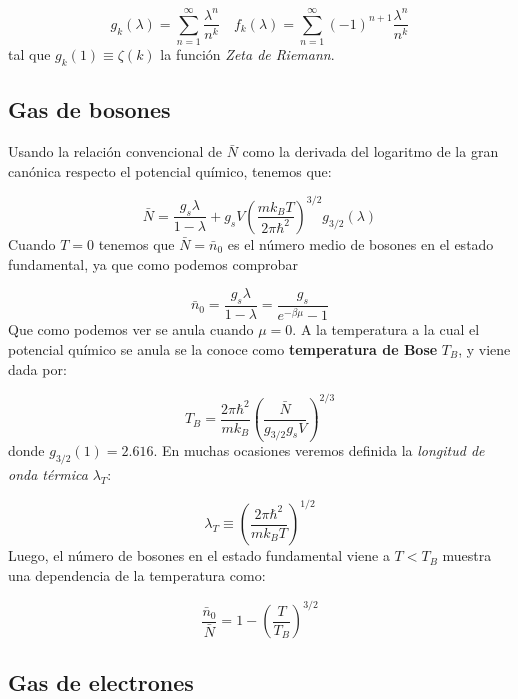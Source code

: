 \documentclass[12pt,a4paper]{article}
\numberwithin{equation}{section}
\numberwithin{figure}{section}
\newcommand{\parentesis}[1]{\left( #1  \right)}
\theoremstyle{definition}
\begin{document}
\begin{equation}
g_k (\lambda) = \sum_{n=1}^\infty \frac{\lambda^n}{n^k} \quad f_k (\lambda) = \sum_{n=1}^\infty (-1)^{n+1} \frac{\lambda^n}{n^k} 
\end{equation}
tal que $g_k(1)\equiv \zeta (k)$ la función \textit{Zeta de Riemann}. 

\subsection{Gas de bosones}

Usando la relación convencional de $\bar{N}$ como la derivada del logaritmo de la gran canónica respecto el potencial químico, tenemos que:

\begin{equation}
\bar{N} = \frac{g_s \lambda}{1-\lambda} + g_s V \parentesis{\frac{m k_B T}{2 \pi \hbar^2}}^{3/2} g_{3/2} (\lambda)
\end{equation}
Cuando $T=0$ tenemos que $\bar{N}=\bar{n}_0$ es el número medio de bosones en el estado fundamental, ya que como podemos comprobar

\begin{equation}
\bar{n}_0 = \frac{g_s \lambda}{1-\lambda} = \frac{g_s}{e^{-\beta \mu}-1}
\end{equation}
Que como podemos ver se anula cuando $\mu=0$. A la temperatura a la cual el potencial químico se anula se la conoce como \textbf{temperatura de Bose} $T_B$, y viene dada por:

\begin{equation}
T_B = \frac{2 \pi \hbar^2}{m k_B} \parentesis{\frac{\bar{N}}{g_{3/2} g_s V}}^{2/3}
\end{equation}
donde $g_{3/2}(1) = 2.616$. En muchas ocasiones veremos definida la \textit{longitud de onda térmica} $\lambda_T$:

\begin{equation}
\lambda_T \equiv \parentesis{\frac{2\pi \hbar^2}{mk_B T}}^{1/2}
\end{equation}
Luego, el número de bosones en el estado fundamental viene a $T<T_B$ muestra una dependencia de la temperatura como:

\begin{equation}
\frac{\bar{n}_0}{\bar{N}} = 1 - \parentesis{\frac{T}{T_B}}^{3/2}
\end{equation}
\subsection{Gas de electrones}
\end{document}
